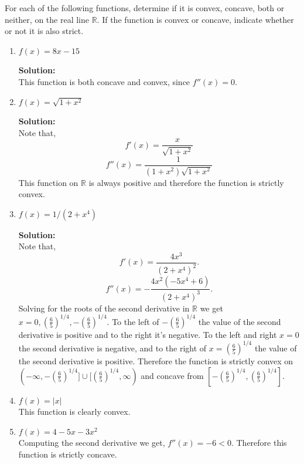 \documentclass[12pt]{article}
\makeatletter
\theoremstyle{homework}
\newenvironment{exercise}[1]
{\def\@currentlabel{#1}\exercisecore}
{\endexercisecore}
\newcommand{\localhead}[1]{\par\smallskip\noindent\textbf{#1}\nobreak\\}%
\newcommand\solution{\localhead{Solution:}}
\newcommand{\Reals}{\ensuremath{\mathbb R}}
\let\RR\Reals
\makeatother
\begin{document}
\begin{exercise}{P5}For each of the following functions, determine if it is convex, concave, both or neither, on the real line $\RR$. 
  If the function is convex or concave, indicate whether or not it is also strict.\\
  \begin{enumerate}
    \item[a.] $f(x) = 8x - 15$\\
    \solution This function is both concave and convex, since $f''(x) = 0$. 
    \vspace*{.15in}

    \item[b.] $f(x) = \sqrt{1 + x^2}$\\
    \solution Note that, 
    \begin{equation*}
      f'(x) =\frac{x}{\sqrt{1+x^2}}
    \end{equation*}
    \begin{equation*}
      f''(x) = \frac{1}{\left(1+x^2\right)\sqrt{1+x^2}}
    \end{equation*}
    This function on $\RR$ is always positive and therefore the function is strictly convex. 
    \vspace*{.15in}



    \item[c.]$f(x) = 1/(2 + x^4)$\\
    \solution Note that, 
    \begin{equation*}
      f'(x) = \frac{4x^3}{\left(2+x^4\right)^2}.
    \end{equation*}
    \begin{equation*}
      f''(x) = -\frac{4x^2\left(-5x^4+6\right)}{\left(2+x^4\right)^3}.
    \end{equation*}
    Solving for the roots of the second derivative in $\RR$ we get $x = 0, (\frac{6}{5})^{1/4}, -(\frac{6}{5})^{1/4}$. To the left of $-(\frac{6}{5})^{1/4}$ the value 
    of the second derivative is positive and to the right it's negative. To the left and right $x = 0$ the second derivative is negative, and to the right of $x = (\frac{6}{5})^{1/4}$
    the value of the second derivative is positive. 
    Therefore the function is strictly convex on $(-\infty, -(\frac{6}{5})^{1/4}] \cup [(\frac{6}{5})^{1/4}, \infty)$ and concave from $[-(\frac{6}{5})^{1/4}, (\frac{6}{5})^{1/4}]$.
    \vspace*{.15in}

    \item[d.] $f(x) = |x|$\\
    This function is clearly convex.
    \vspace*{.15in}

    \item[e.] $f(x) = 4 - 5x - 3x^2$\\
    Computing the second derivative we get, $f''(x) = - 6 < 0$. Therefore this function is strictly concave. 
  \end{enumerate}
\end{exercise}
\vspace*{.15in}
\end{document}
